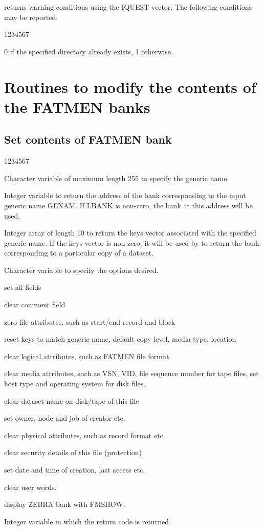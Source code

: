  returns warning conditions using the IQUEST vector.
The following conditions may be reported:
\begin{DLtt}{1234567}
\item[IQUEST(12)]
0 if the specified directory already exists, 1 otherwise.
\end{DLtt}

\section{Routines to modify the contents of the FATMEN banks}
\subsection{Set contents of FATMEN bank}


\begin{DLtt}{1234567}
\item[GENAM]Character variable of maximum length 255 to specify the generic name.
\item[LBANK]
Integer variable to return the address of the bank corresponding
to the input generic name GENAM. If LBANK is non-zero, the bank
at this address will be used.
\item[KEYS]
Integer array of length 10 to return the keys vector associated
with the specified generic name. If the keys vector is non-zero,
it will be used by  to return the bank corresponding to
a particular copy of a dataset.
\item[CHOPT]
Character variable to specify the options desired.
\begin{DLtt}{12}
\item[A]set all fields
\item[C]clear comment field
\item[F]zero file attributes, such as start/end record and block
\item[K]reset keys to match generic name, default copy level, media type, location
\item[L]clear logical attributes, such as FATMEN file format
\item[M]clear media attributes, such as VSN, VID, file sequence number for tape
files, set host type and operating system for disk files.
\item[N]clear dataset name on disk/tape of this file
\item[O]set owner, node and job of creator etc.
\item[P]clear physical attributes, such as record format etc.
\item[S]clear security details of this file (protection)
\item[T]set date and time of creation, last access etc.
\item[U]clear user words.
\item[Z]display ZEBRA bank with FMSHOW.
\end{DLtt}
\item[IRC]
Integer variable in which the return code is returned.
\end{DLtt}

